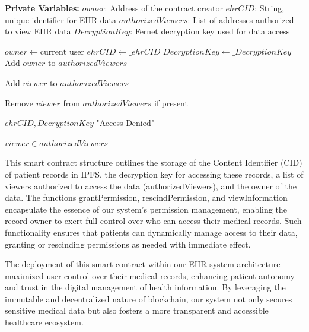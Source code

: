 \documentclass[12pt]{report}
\begin{document}
\begin{algorithm}
\caption{EHRContract: Electronic Health Records Smart Contract}
\begin{algorithmic}[1]

\State \textbf{Private Variables:}
\State \quad $owner$: Address of the contract creator
\State \quad $ehrCID$: String, unique identifier for EHR data
\State \quad $authorizedViewers$: List of addresses authorized to view EHR data
\State \quad $DecryptionKey$: Fernet decryption key used for data access

    \State $owner \gets \text{current user}$
    \State $ehrCID \gets \_ehrCID$
    \State $DecryptionKey \gets \_DecryptionKey$
    \State Add $owner$ to $authorizedViewers$
\EndProcedure

        \State Add $viewer$ to $authorizedViewers$
    \EndIf
\EndProcedure

        \State Remove $viewer$ from $authorizedViewers$ if present
    \EndIf
\EndProcedure

        \State \Return $ehrCID, DecryptionKey$
    \Else
        \State \Return "Access Denied"
    \EndIf
\EndFunction

    \State \Return $viewer \in authorizedViewers$
\EndFunction

\end{algorithmic}
\label{pseudocode}
\end{algorithm}
This smart contract structure outlines the storage of the Content Identifier (CID) of patient records in IPFS, the decryption key for accessing these records, a list of viewers authorized to access the data (authorizedViewers), and the owner of the data. The functions grantPermission, rescindPermission, and viewInformation encapsulate the essence of our system's permission management, enabling the record owner to exert full control over who can access their medical records. Such functionality ensures that patients can dynamically manage access to their data, granting or rescinding permissions as needed with immediate effect.

The deployment of this smart contract within our EHR system architecture maximized user control over their medical records, enhancing patient autonomy and trust in the digital management of health information. By leveraging the immutable and decentralized nature of blockchain, our system not only secures sensitive medical data but also fosters a more transparent and accessible healthcare ecosystem.
\end{document}
